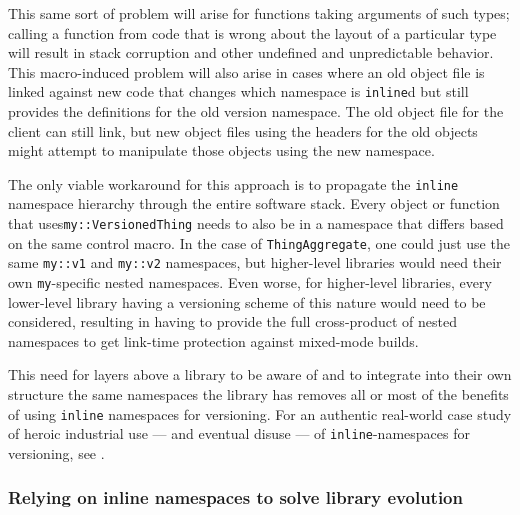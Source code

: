 This same sort of problem will arise for functions taking arguments of
such types; calling a function from code that is wrong about the layout
of a particular type will result in stack corruption and other undefined
and unpredictable behavior. This macro-induced problem will also arise in cases where an old object
file is linked against new code that changes which namespace is
\lstinline!inline!d but still provides the definitions for the old version
namespace. The old object file for the client can still link, but new
object files using the headers for the old objects might attempt to
manipulate those objects using the new namespace.

The only viable workaround for this approach is to propagate the
\lstinline!inline! namespace hierarchy through the entire software stack.
Every object or function that uses\linebreak[4] \lstinline!my::VersionedThing! needs to
also be in a namespace that differs based on the same control macro. In
the case of \lstinline!ThingAggregate!, one could just use the same
\lstinline!my::v1! and \lstinline!my::v2! namespaces, but higher-level
libraries would need their own \lstinline!my!-specific nested namespaces.
Even worse, for higher-level libraries, every lower-level library having
a versioning scheme of this nature would need to be considered,
resulting in having to provide the full cross-product of nested
namespaces to get link-time protection against mixed-mode builds.

This need for layers above a library to be aware of and to integrate
into their own structure the same namespaces the library has removes all
or most of the benefits of using \lstinline!inline! namespaces for
versioning. For an authentic real-world case study of heroic industrial use --- and
eventual disuse --- of \lstinline!inline!-namespaces for versioning, see . 

\subsubsection[Relying on \lstinline!inline! namespaces to solve library evolution]{Relying on {\SubsubsecCode inline} namespaces to solve library evolution}\label{specializing-templates-in-std-can-be-problematic}

